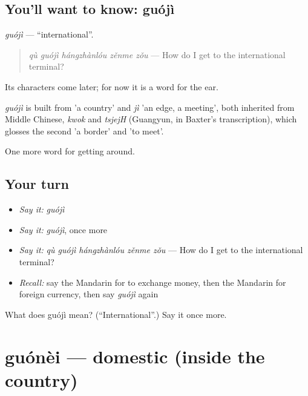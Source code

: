\subsection*{You'll want to know: guójì}
\emph{guójì} — \textquotedblleft{}international\textquotedblright{}.

\begin{quote}
\emph{qù guójì hángzhànlóu zěnme zǒu} — How do I get to the international terminal?
\end{quote}

Its characters come later; for now it is a word for the ear.

\begin{cousinweb}
\emph{guójì} is built from  'a country' and \emph{jì} 'an edge, a meeting', both inherited from Middle Chinese, \emph{kwok} and \emph{tsjejH} (Guangyun, in Baxter's transcription), which glosses the second 'a border' and 'to meet'.
\end{cousinweb}

\begin{grammarlens}[title={What you've built}]
One more word for getting around.
\end{grammarlens}

\subsection*{Your turn}
\begin{itemize}
\raggedright
  \item \emph{Say it:} \emph{guójì}
  \item \emph{Say it:} \emph{guójì}, once more
  \item \emph{Say it:} \emph{qù guójì hángzhànlóu zěnme zǒu} — How do I get to the international terminal?
  \item \emph{Recall:} say the Mandarin for to exchange money, then the Mandarin for foreign currency, then say \emph{guójì} again
\end{itemize}

\begin{tcolorbox}[breakable,colback=teal!4,colframe=teal!35!black,title={Before you move on}]
What does guójì mean? (\textquotedblleft{}International\textquotedblright{}.) Say it once more.
\end{tcolorbox}
\section[guónèi]{guónèi — domestic (inside the country)}

